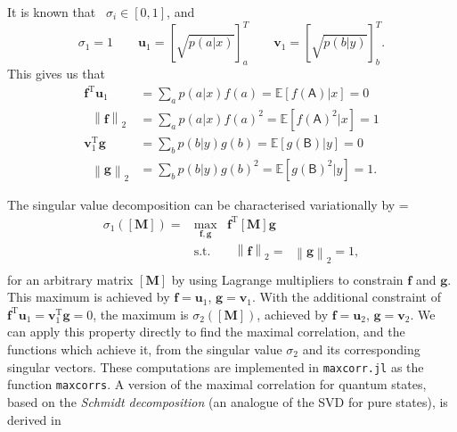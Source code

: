 \documentclass[10pt, a4paper]{article}
\numberwithin{equation}{section} %
\theoremstyle{definition}
\theoremstyle{plain}
\newenvironment{Array}[1] %
{\def\arraystretch{1.75}\everymath={\displaystyle}\begin{equation}\begin{array}{#1}}
{\end{array}\end{equation}}
\newcommand{\norm}[1]{\mathop{}\left\lVert#1\right\rVert}
\newcommand{\?}{\mathrel{?}} %
\newcommand{\tpose}{\mathrm{T}}
\newcommand{\cvec}[1]{\boldsymbol{\mathbf{#1}}}    %
\newcommand{\rvec}[1]{\boldsymbol{\mathbf{#1}}^\tpose} %
\newcommand{\matr}[2][]{\left[\mathbf{#2}#1\right]} %
\newcommand{\E}{\mathbb{E}} %
\newcommand{\crv}[1]{\mathsf{#1}}
\begin{document}
                        It is known that~\cite[Thm 1]{ComputingMaxCorr} \(\sigma_i \in [0, 1]\), and
                        \begin{equation}
                          \sigma_1 = 1 \qquad \cvec{u}_1 = {[\sqrt{p(a|x)}]}_a^T \qquad \cvec{v}_1 = {[\sqrt{p(b|y)}]}_b^T.
                        \end{equation}
                        This gives us that
                        \begin{align}
                          \rvec{f} \cvec{u}_1 &= \sum_a p(a|x) f(a) = \E[f(\crv{A})|x] = 0 \\
                          \norm{\cvec{f}}_2 &= \sum_a p(a|x) {f(a)}^2 = \E[{f(\crv{A})}^2|x] = 1 \\
                          \rvec{v}_1 \cvec{g} &= \sum_b p(b|y) g(b) = \E[g(\crv{B})|y] = 0 \\
                          \norm{\cvec{g}}_2 &= \sum_b p(b|y) {g(b)}^2 = \E[{g(\crv{B})}^2|y] = 1.
                        \end{align}

                        The singular value decomposition can be characterised variationally by
                        \begin{Array}{rcl}
                          \sigma_1(\matr{M}) = & \max_{\cvec{f},\cvec{g}} & \rvec{f} \matr{M} \cvec{g} \\
                                               & \text{s.t.} & \norm{\cvec{f}}_2 = \norm{\cvec{g}}_2 = 1, \\
                        \end{Array}
                        for an arbitrary matrix \(\matr{M}\) by using Lagrange multipliers to constrain \(\cvec{f}\) and \(\cvec{g}\). This maximum is achieved by \(\cvec{f} = \cvec{u}_1\), \(\cvec{g} = \cvec{v}_1\). With the additional constraint of \(\rvec{f} \cvec{u}_1 = \rvec{v}_1 \cvec{g} = 0\), the maximum is \(\sigma_2(\matr{M})\), achieved by \(\cvec{f} = \cvec{u}_2\), \(\cvec{g} = \cvec{v}_2\). We can apply this property directly to find the maximal correlation, and the functions which achieve it, from the singular value \(\sigma_2\) and its corresponding singular vectors. These computations are implemented in \verb`maxcorr.jl` as the function \verb`maxcorrs`. A version of the maximal correlation for quantum states, based on the \emph{Schmidt decomposition} (an analogue of the SVD for pure states), is derived in~\cite{QuantumDPI}
\end{document}
